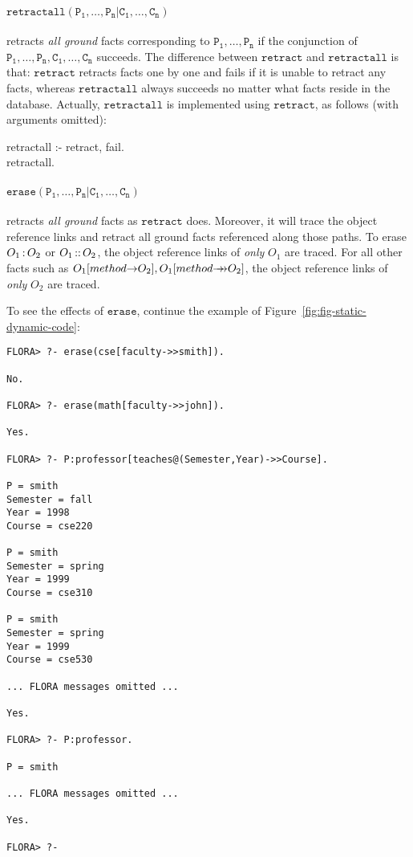 \documentclass[11pt]{report}
\begin{document}
\paragraph{$\mathtt{retractall(P_1,\ldots,P_n | C_1,\ldots,C_n)}$} retracts \emph{all ground}
facts corresponding to $\mathtt{P_1,\ldots,P_n}$ if the conjunction of
$\mathtt{P_1,\ldots,P_n,C_1,\ldots,C_n}$ succeeds. The difference between $\mathtt{retract}$
and $\mathtt{retractall}$ is that: $\mathtt{retract}$ retracts facts one by one and fails
if it is unable to retract any facts, whereas $\mathtt{retractall}$ always succeeds no
matter what facts reside in the database. Actually, $\mathtt{retractall}$ is implemented
using $\mathtt{retract}$, as follows (with arguments omitted):
\begin{qrules}
retractall :- retract, fail. \\
retractall.
\end{qrules}

\paragraph{$\mathtt{erase(P_1,\ldots,P_n | C_1,\ldots,C_n)}$} retracts \emph{all ground} facts
as $\mathtt{retract}$ does. Moreover, it will trace the object reference links and retract
all ground facts referenced along those paths. To erase $O_1{\,{\bf{:}}\,}O_2$ or $O_1{\,{\bf{::}}\,}O_2$,
the object reference links of \emph{only} $O_1$ are traced. For all other \fl facts such as
$O_1[method{{\rightarrow}}O_2],O_1[method{{\rightarrow\!\!\!\!\rightarrow}}O_2]$, the object reference links of \emph{only} $O_2$
are traced. 

To see the effects of $\mathtt{erase}$, continue
the example of Figure~\ref{fig:fig-static-dynamic-code}:
\begin{verbatim}
FLORA> ?- erase(cse[faculty->>smith]).

No.

FLORA> ?- erase(math[faculty->>john]).

Yes.

FLORA> ?- P:professor[teaches@(Semester,Year)->>Course].

P = smith
Semester = fall
Year = 1998
Course = cse220

P = smith
Semester = spring
Year = 1999
Course = cse310

P = smith
Semester = spring
Year = 1999
Course = cse530

... FLORA messages omitted ...

Yes.

FLORA> ?- P:professor.

P = smith

... FLORA messages omitted ...

Yes.

FLORA> ?- 
\end{verbatim}
\end{document}
